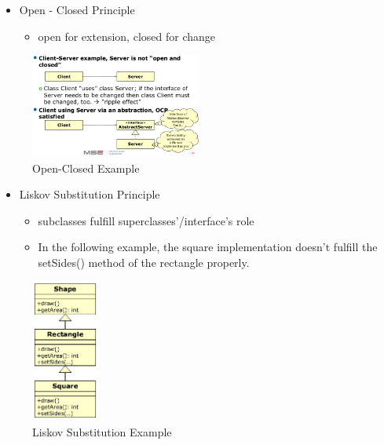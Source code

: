 \begin{itemize}
\tightlist
\item
  Open - Closed Principle

  \begin{itemize}
  \tightlist
  \item
    open for extension, closed for change
  \end{itemize}
\end{itemize}

\begin{figure}[H]
\centering
\includegraphics[width=0.5\textwidth]{figures/open-closedprinciple.png}
\caption{Open-Closed Example}
\end{figure}

\begin{itemize}
\tightlist
\item
  Liskov Substitution Principle

  \begin{itemize}
  \tightlist
  \item
    subclasses fulfill superclasses'/interface's role
  \item
    In the following example, the square implementation doesn't fulfill
    the setSides() method of the rectangle properly.
  \end{itemize}
\end{itemize}

\begin{figure}[H]
\centering
\includegraphics[width=0.2\textwidth]{figures/lspexample.png}
\caption{Liskov Substitution Example}
\end{figure}


